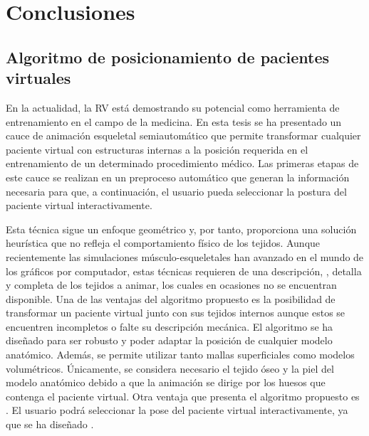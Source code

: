 \chapter{Conclusiones}
\label{cap:conclu}

\section{Algoritmo de posicionamiento de pacientes virtuales}
\label{conclu:posing}

En la actualidad, la \ac{RV} está demostrando su potencial como herramienta de entrenamiento en el campo de la medicina. %
En esta tesis se ha presentado un cauce de animación esqueletal semiautomático que permite transformar cualquier paciente virtual con estructuras internas a la posición requerida en el entrenamiento de un determinado procedimiento médico. Las primeras etapas de este cauce se realizan en un preproceso automático que generan la información necesaria para que, a continuación, el usuario pueda seleccionar la postura del paciente virtual interactivamente.

Esta técnica sigue un enfoque geométrico y, por tanto, proporciona una solución heurística que no refleja  el comportamiento físico de los tejidos. Aunque recientemente las simulaciones músculo-esqueletales han avanzado  en el mundo de los gráficos por computador, estas técnicas requieren de una descripción, , detalla y completa de los tejidos a animar, los cuales en ocasiones no se encuentran disponible. 
 Una de las ventajas del algoritmo propuesto es la posibilidad de transformar un paciente virtual junto con sus tejidos internos aunque estos se encuentren incompletos o falte su descripción mecánica. El algoritmo se ha diseñado para ser robusto y poder adaptar la posición de cualquier modelo anatómico. Además, se permite utilizar tanto mallas superficiales como modelos volumétricos. Únicamente, se considera necesario el tejido óseo y la piel del modelo anatómico debido a que la animación se dirige por los huesos que contenga el paciente virtual.
Otra ventaja que presenta el algoritmo propuesto es . El usuario podrá seleccionar la pose del paciente virtual interactivamente, ya que se ha diseñado  .

